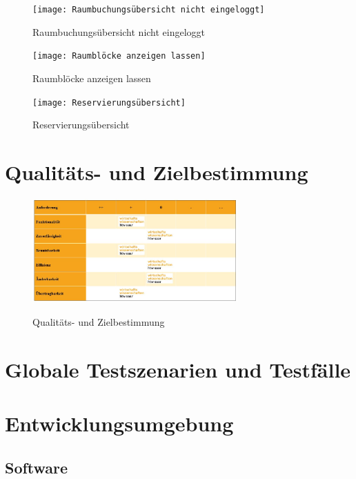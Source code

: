 \documentclass[a4paper,report,headsepline]{scrreprt}
\begin{document}
\begin{figure}[h]
    \centering
    \caption{Raumbuchungsübersicht nicht eingeloggt}
    \texttt{[image: Raumbuchungsübersicht nicht eingeloggt]}
    \label{fig:raumbuchung}
\end{figure}


\begin{figure}[h]
    \centering
    \caption{Raumblöcke anzeigen lassen}
    \texttt{[image: Raumblöcke anzeigen lassen]}
    \label{fig:raumbuchung}
\end{figure}


\begin{figure}[h]
    \centering
    \caption{Reservierungsübersicht}
    \texttt{[image: Reservierungsübersicht]}
    \label{fig:raumbuchung}
\end{figure}




\chapter{Qualitäts- und Zielbestimmung}\label{qualitäts-und zielbestimmung}
\begin{figure}[h]
    \centering
    \caption{Qualitäts- und Zielbestimmung}
    \includegraphics[width=0.7\textwidth]{Quali}
    \label{fig:qualitätsbestimmung}
\end{figure}


\chapter{Globale Testszenarien und Testfälle}\label{testszenarien}

\chapter{Entwicklungsumgebung}\label{entwicklungsumgebung}
\section{Software}\label{software}
\end{document}
